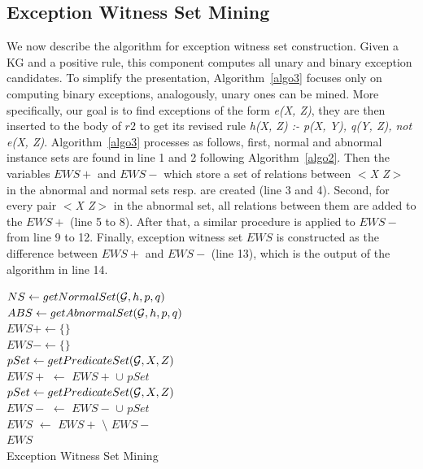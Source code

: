 \subsection{Exception Witness Set Mining}

We now describe the algorithm for exception witness set construction. Given a KG and a positive rule, this component computes all unary and binary exception candidates. To simplify the presentation, Algorithm~\ref{algo3} focuses only on computing binary exceptions, analogously, unary ones can be mined. More specifically, our goal is to find exceptions of the form \textit{e(X, Z)}, they are then inserted to the body of $r2$ to get its revised rule \textit{h(X, Z) :- p(X, Y), q(Y, Z), not e(X, Z)}. Algorithm~\ref{algo3} processes as follows, first, normal and abnormal instance sets are found in line 1 and 2 following Algorithm~\ref{algo2}. Then the variables $EWS+$ and $EWS-$ which store a set of relations between \textit{$<$X Z$>$} in the abnormal and normal sets resp. are created (line 3 and 4). Second, for every pair \textit{$<$X Z$>$} in the abnormal set, all relations between them are added to the $EWS+$ (line 5 to 8). After that, a similar procedure is applied to $EWS-$ from line 9 to 12. Finally, exception witness set $EWS$ is constructed as the difference between $EWS+$ and $EWS-$ (line 13), which is the output of the algorithm in line 14.

\IncMargin{1.5em}
\begin{algorithm}[H]
\DontPrintSemicolon
\SetAlgoLined
{}
\BlankLine
$NS \leftarrow getNormalSet(\mathcal{G}, h, p, q)$\\
$ABS \leftarrow getAbnormalSet(\mathcal{G}, h, p, q)$\\
$EWS+ \leftarrow \{\}$\\
$EWS- \leftarrow \{\}$\\
\BlankLine
{} {
	$pSet \leftarrow getPredicateSet(\mathcal{G}, X, Z)$\\
	$EWS+$ $\leftarrow$ $EWS+$ $\cup$ $pSet$\\
}
 {
	$pSet \leftarrow getPredicateSet(\mathcal{G}, X, Z)$\\
	$EWS-$ $\leftarrow$ $EWS-$ $\cup$ $pSet$\\
}
$EWS$ $\leftarrow$ $EWS+$ $\setminus$ $EWS-$\\
\Return $EWS$\\
\caption{Exception Witness Set Mining}
\label{algo3}
\end{algorithm}
\DecMargin{1.5em}

